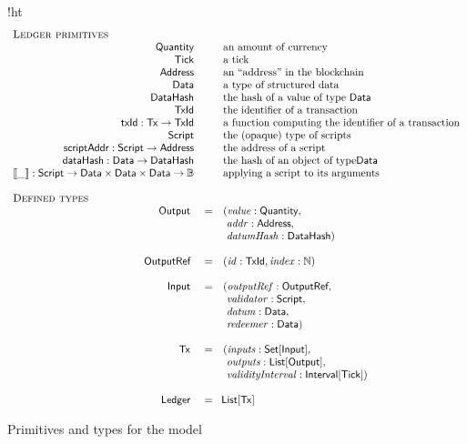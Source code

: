 \begin{ruledfigure}{!ht}
  \begin{displaymath}
  \begin{array}{rll}
    \multicolumn{3}{l}{\textsc{Ledger primitives}}\\
    \qty{} && \mbox{an amount of currency}\\
    \tick && \mbox{a tick}\\
    \Address && \mbox{an ``address'' in the blockchain}\\
    \Data && \mbox{a type of structured data}\\
    \DataHash && \mbox{the hash of a value of type \Data{}}\\
    \TxId && \mbox{the identifier of a transaction}\\
    \txId : \eutxotx \rightarrow \TxId && \mbox{a function computing the identifier of a transaction}\\
    \script && \mbox{the (opaque) type of scripts}\\
    \scriptAddr : \script \rightarrow \Address && \mbox{the address of a script}\\
    \hashData : \Data \rightarrow \DataHash && \mbox{the hash of an object of type\Data}\\
    \llbracket \_ \rrbracket : \script \rightarrow \Data \times \Data \times
    \Data \rightarrow \B && \mbox{applying a script to its arguments}\\
    \\
    \multicolumn{3}{l}{\textsc{Defined types}}\\
    \s{Output } &=&(\val: \qty,\\
                & &\ \addr: \Address,\\
                & &\ \datumHsh: \DataHash)\\
    \\
    \s{OutputRef } &=&(\txrefid: \TxId, \idx: \N)\\
    \\
    \s{Input } &=&(\outputref: \s{OutputRef},\\
               & &\ \validator: \script,\\
               & &\ \datum: \Data,\\
               & &\ \redeemer: \Data)\\
     \\
     \eutxotx\s{ } &=&(\inputs: \Set{\s{Input}},\\
                   & &\ \outputs: \List{\s{Output}},\\
                   & &\ \validityInterval: \Interval{\tick})\\
     \\
     \s{Ledger } &=&\!\List{\eutxotx}\\
  \end{array}
  \end{displaymath}
  \caption{Primitives and types for the \EUTXO{} model}
  \label{fig:eutxo-types}
\end{ruledfigure}

